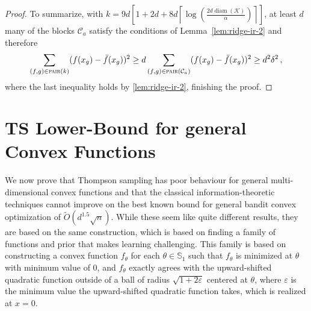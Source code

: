 \documentclass[letter, 12pt]{report}
\newcommand{\ceil}[1]{\left\lceil #1 \right\rceil}
\newcommand{\pair}{\operatorname{\textsc{pair}}}
\newcommand{\sphere}{\mathbb{S}}
\newcommand{\cK}{\mathcal K}
\newcommand{\cC}{\mathcal C}
\newcommand{\diam}{\operatorname{diam}}
\newcommand{\1}{\mathbf{1}}
\newcommand{\ts}{\textsc{TS}\xspace}
\renewcommand{\epsilon}{\varepsilon}
\theoremstyle{plain}
\theoremstyle{definition}
\theoremstyle{remark}
\begin{document}
\begin{proof}
    To summarize, with $k = 9d\left[1 + 2d + 8d\ceil{\log\left(\frac{2d \diam(\cK)}{\alpha}\right)}\right]$,
    at least $d$ many of the blocks $\cC_a$ satisfy the conditions of Lemma~\ref{lem:ridge-ir-2} and therefore
    \begin{align*}
        \sum_{(f,g) \in \pair(k)} (f(x_g) - \bar f(x_g))^2
        \geq d \sum_{(f,g) \in \pair(\cC_a)} (f(x_g) - \bar f(x_g))^2
        \geq d^2 \delta^2\,,
    \end{align*}
    where the last inequality holds by \cref{lem:ridge-ir-2}, finishing the proof.
\end{proof}

\chapter{\ts Lower-Bound for general Convex Functions}
\label{chp:ts-lower-proof}
We now prove that
Thompson sampling has poor behaviour for general multi-dimensional convex functions and
that the classical information-theoretic techniques cannot improve on the best known bound for general bandit convex optimization
of $\tilde O(d^{1.5} \sqrt{n})$. While these seem like quite different results, they are based on the same construction, which is
based on finding a family of functions and prior that makes learning challenging.
This family is based on constructing a convex function $f_\theta$ for each $\theta \in \sphere_1$ such that $f_\theta$ is minimized at $\theta$ with minimum value of $0$, and $f_\theta$ exactly agrees with the upward-shifted quadratic function outside of a ball of radius $\sqrt{1 + 2\epsilon}$ centered at $\theta$, where $\epsilon$ is the minimum value the upward-shifted quadratic function takes, which is realized at $x=0$.
\end{document}
